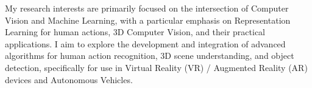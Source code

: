 


\begin{cventries}

\cvtext
{ %
\begin{cvitems}
My research interests are primarily focused on the intersection of Computer Vision and Machine Learning, with a particular emphasis on Representation Learning for human actions, 3D Computer Vision, and their practical applications. 
I aim to explore the development and integration of advanced algorithms for human action recognition, 3D scene understanding, and object detection, specifically for use in Virtual Reality (VR) / Augmented Reality (AR) devices and Autonomous Vehicles.
\end{cvitems}
}


\end{cventries}
